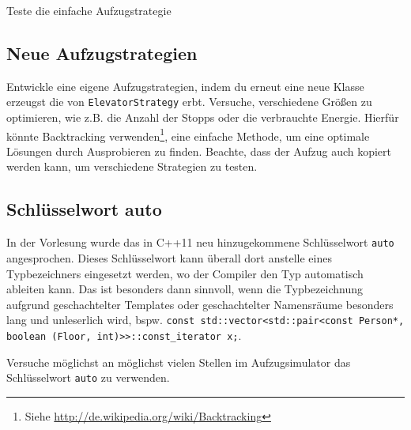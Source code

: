 \begin{algorithm}[H]
 \SetAlgoLined
\end{algorithm}

Teste die einfache Aufzugstrategie

\subsection{Neue Aufzugstrategien \optional}
\optionaltextbox
Entwickle eine eigene Aufzugstrategien, indem du erneut eine neue Klasse erzeugst die von \lstinline{ElevatorStrategy} erbt.
Versuche, verschiedene Größen zu optimieren, wie z.B. die Anzahl der Stopps oder die verbrauchte Energie.
Hierfür könnte Backtracking verwenden\footnote{Siehe \url{http://de.wikipedia.org/wiki/Backtracking}}, eine einfache Methode, um eine optimale Lösungen durch Ausprobieren zu finden.
Beachte, dass der Aufzug auch kopiert werden kann, um verschiedene Strategien zu testen.

\subsection{Schlüsselwort auto \optional}
\optionaltextbox
In der Vorlesung wurde das in C++11 neu hinzugekommene Schlüsselwort \lstinline{auto} angesprochen.
Dieses Schlüsselwort kann überall dort anstelle eines Typbezeichners eingesetzt werden, wo der Compiler den Typ automatisch ableiten kann.
Das ist besonders dann sinnvoll, wenn die Typbezeichnung aufgrund geschachtelter Templates oder geschachtelter Namensräume besonders lang und unleserlich wird, bspw. \lstinline{const std::vector<std::pair<const Person*, boolean (Floor, int)>>::const_iterator x;}.

Versuche möglichst an möglichst vielen Stellen im Aufzugsimulator das Schlüsselwort \lstinline{auto} zu verwenden.
